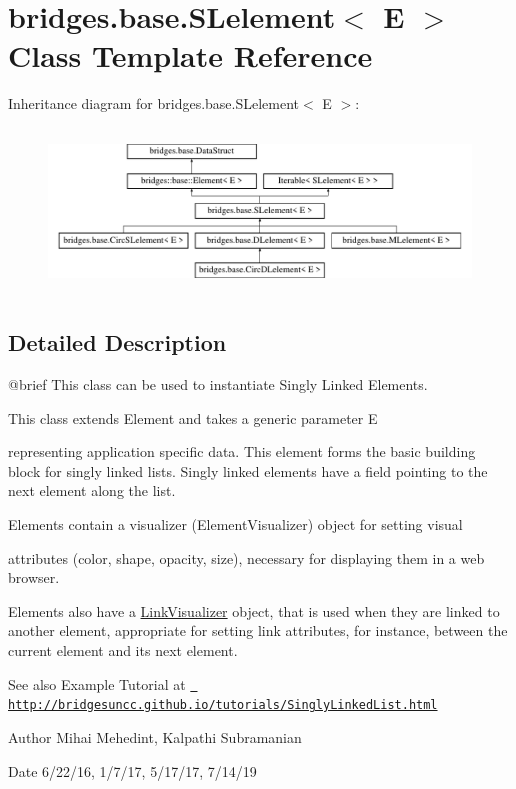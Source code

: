 \hypertarget{classbridges_1_1base_1_1_s_lelement}{}\section{bridges.\+base.\+S\+Lelement$<$ E $>$ Class Template Reference}
\label{classbridges_1_1base_1_1_s_lelement}
Inheritance diagram for bridges.\+base.\+S\+Lelement$<$ E $>$\+:\begin{figure}[H]
\begin{center}
\leavevmode
\includegraphics[height=4.402516cm]{classbridges_1_1base_1_1_s_lelement}
\end{center}
\end{figure}


\subsection{Detailed Description}
\begin{DoxyVerb}@brief This class can be used to instantiate Singly Linked Elements.

This class extends Element and takes a generic parameter E
\end{DoxyVerb}
 representing application specific data. This element forms the basic building block for singly linked lists. Singly linked elements have a field pointing to the next element along the list.

\begin{DoxyVerb}Elements contain a visualizer (ElementVisualizer) object for setting visual
\end{DoxyVerb}
 attributes (color, shape, opacity, size), necessary for displaying them in a web browser.

Elements also have a \mbox{\hyperlink{classbridges_1_1base_1_1_link_visualizer}{Link\+Visualizer}} object, that is used when they are linked to another element, appropriate for setting link attributes, for instance, between the current element and its next element.

\begin{DoxySeeAlso}{See also}
Example Tutorial at \href{http://bridgesuncc.github.io/tutorials/SinglyLinkedList.html}{\texttt{ http\+://bridgesuncc.\+github.\+io/tutorials/\+Singly\+Linked\+List.\+html}}
\end{DoxySeeAlso}
\begin{DoxyAuthor}{Author}
Mihai Mehedint, Kalpathi Subramanian
\end{DoxyAuthor}
\begin{DoxyDate}{Date}
6/22/16, 1/7/17, 5/17/17, 7/14/19
\end{DoxyDate}

